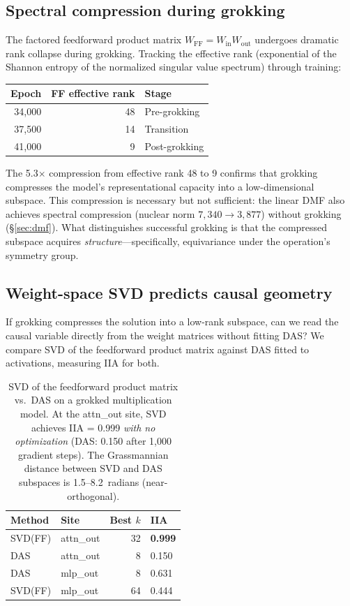 \documentclass{article}
\begin{document}
\subsection{Spectral compression during grokking}
\label{sec:spectral_compression}

The factored feedforward product matrix $W_\text{FF} = W_\text{in} W_\text{out}$
undergoes dramatic rank collapse during grokking. Tracking the effective rank
(exponential of the Shannon entropy of the normalized singular value spectrum)
through training:

\begin{center}
\small
\begin{tabular}{rrl}
\toprule
Epoch & FF effective rank & Stage \\
\midrule
34{,}000 & 48 & Pre-grokking \\
37{,}500 & 14 & Transition \\
41{,}000 & 9 & Post-grokking \\
\bottomrule
\end{tabular}
\end{center}

The 5.3$\times$ compression from effective rank 48 to 9 confirms that
grokking compresses the model's representational capacity into a
low-dimensional subspace. This compression is necessary but not sufficient:
the linear DMF also achieves spectral compression (nuclear norm
$7{,}340 \to 3{,}877$) without grokking (\S\ref{sec:dmf}). What distinguishes
successful grokking is that the compressed subspace acquires
\emph{structure}---specifically, equivariance under the operation's symmetry
group.

\subsection{Weight-space SVD predicts causal geometry}
\label{sec:svd_vs_das}

If grokking compresses the solution into a low-rank subspace, can we read the
causal variable directly from the weight matrices without fitting DAS? We
compare SVD of the feedforward product matrix against DAS fitted to
activations, measuring IIA for both.

\begin{table}[t]
\centering
\small
\begin{tabular}{llrl}
\toprule
Method & Site & Best $k$ & IIA \\
\midrule
SVD(FF) & attn\_out & 32 & \textbf{0.999} \\
DAS     & attn\_out & 8  & 0.150 \\
DAS     & mlp\_out  & 8  & 0.631 \\
SVD(FF) & mlp\_out  & 64 & 0.444 \\
\bottomrule
\end{tabular}
\caption{SVD of the feedforward product matrix vs.\ DAS on a grokked
multiplication model. At the attn\_out site, SVD achieves IIA = 0.999
\emph{with no optimization} (DAS: 0.150 after 1{,}000 gradient steps).
The Grassmannian distance between SVD and DAS subspaces is
1.5--8.2~radians (near-orthogonal).}
\label{tab:svd_vs_das}
\end{table}
\end{document}
